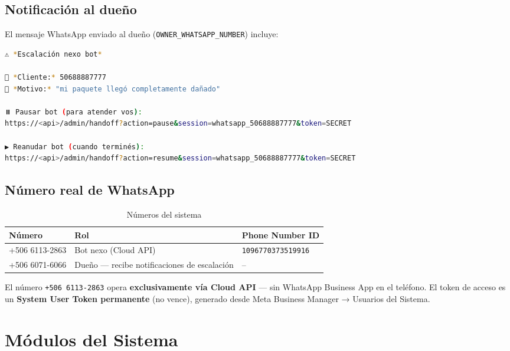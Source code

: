 \documentclass[12pt,a4paper]{article}
\begin{document}
\subsection{Notificación al dueño}

El mensaje WhatsApp enviado al dueño (\texttt{OWNER\_WHATSAPP\_NUMBER}) incluye:

\begin{lstlisting}[language=bash, caption={Formato del mensaje de escalación al dueño}]
⚠️ *Escalación nexo bot*

👤 *Cliente:* 50688887777
💬 *Motivo:* "mi paquete llegó completamente dañado"

⏸️ Pausar bot (para atender vos):
https://<api>/admin/handoff?action=pause&session=whatsapp_50688887777&token=SECRET

▶️ Reanudar bot (cuando terminés):
https://<api>/admin/handoff?action=resume&session=whatsapp_50688887777&token=SECRET
\end{lstlisting}

\subsection{Número real de WhatsApp}

\begin{table}[H]
\centering
\begin{tabular}{@{}lll@{}}
\toprule
\textbf{Número} & \textbf{Rol} & \textbf{Phone Number ID} \\
\midrule
+506 6113-2863 & Bot nexo (Cloud API) & \texttt{1096770373519916} \\
+506 6071-6066 & Dueño — recibe notificaciones de escalación & -- \\
\bottomrule
\end{tabular}
\caption{Números del sistema}
\end{table}

\begin{nexobox}
El número \texttt{+506 6113-2863} opera \textbf{exclusivamente vía Cloud API} — sin WhatsApp Business App
en el teléfono. El token de acceso es un \textbf{System User Token permanente} (no vence), generado
desde Meta Business Manager → Usuarios del Sistema.
\end{nexobox}

\section{Módulos del Sistema}
\end{document}

